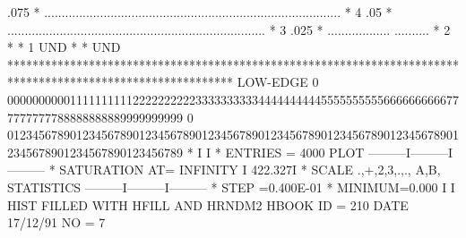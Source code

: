 \begin{Listing}
      .075  *               .....................................................................................      *   4
      .05   *                   ..........................................................................             *   3
      .025  *                        ..................                          ..........                            *   2
            *                                                                                                          *   1
   UND      *                                                                                                          * UND
            ************************************************************************************************************
 LOW-EDGE   0   0000000000111111111122222222223333333333444444444455555555556666666666777777777788888888889999999999
            0   0123456789012345678901234567890123456789012345678901234567890123456789012345678901234567890123456789
  *                                                          I         I
  * ENTRIES =     4000                   PLOT       ---------I---------I---------
  * SATURATION  AT=     INFINITY                             I  422.327I
  * SCALE  .,+,2,3,.,., A,B,           STATISTICS   ---------I---------I---------
  * STEP =0.400E-01 * MINIMUM=0.000                          I         I
\newpage
 HIST FILLED WITH HFILL AND HRNDM2                                               
 HBOOK     ID =       210                                        DATE  17/12/91              NO =   7
 

\end{Listing}
